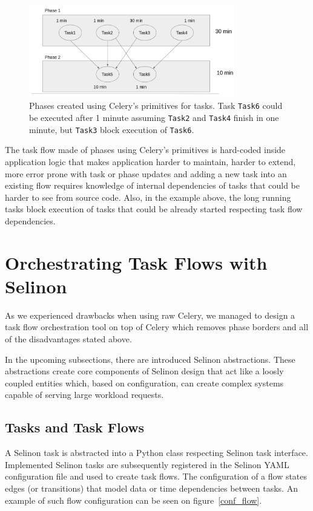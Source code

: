 \documentclass[a4paper]{llncs}
\begin{document}
\begin{figure}
  \centering
  \includegraphics[width=0.8\textwidth]{fig/flow1.png}
  \caption{Phases created using Celery's primitives for tasks. Task \texttt{Task6} could be executed after 1 minute assuming \texttt{Task2} and \texttt{Task4} finish in one minute, but \texttt{Task3} block execution of \texttt{Task6}.}
  \label{celery_phases}
\end{figure}

The task flow made of phases using Celery's primitives is hard-coded inside application logic that makes application harder to maintain, harder to extend, more error prone with task or phase updates and adding a new task into an existing flow requires knowledge of internal dependencies of tasks that could be harder to see from source code. Also, in the example above, the long running tasks block execution of tasks that could be already started respecting task flow dependencies.

\section{Orchestrating Task Flows with Selinon}

As we experienced drawbacks when using raw Celery, we managed to design a task flow orchestration tool on top of Celery which removes phase borders and all of the disadvantages stated above.

In the upcoming subsections, there are introduced Selinon abstractions. These abstractions create core components of Selinon design that act like a loosly coupled entities which, based on configuration, can create complex systems capable of serving large workload requests.

\subsection{Tasks and Task Flows}

A Selinon task is abstracted into a Python class respecting Selinon task interface. Implemented Selinon tasks are subsequently registered in the Selinon YAML configuration file and used to create task flows. The configuration of a flow states edges (or transitions) that model data or time dependencies between tasks. An example of such flow configuration can be seen on figure~\ref{conf_flow}.
\end{document}
